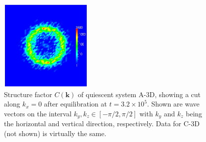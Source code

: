 \documentclass[8.5pt,twoside,twocolumn]{article}
\newcommand{\e}[1]{\times10^{#1}}
\begin{document}
\begin{figure}[htp!]
\centering
\includegraphics[angle=0,width=0.40\textwidth]{ck_y-slice_run786_320.jpg}
\caption{Structure factor $C({\mathbf k})$ of quiescent system A-3D, showing a cut along $k_x=0$ after equilibration at $t=3.2\e{5}$. Shown are wave vectors on the interval $k_y, k_z\in[-\pi/2 ,\pi/2 ]$ with $k_y$ and $k_z$ being the horizontal and vertical direction, respectively. Data for C-3D (not shown) is virtually the same.}
\label{fig11}
\end{figure}
\end{document}
